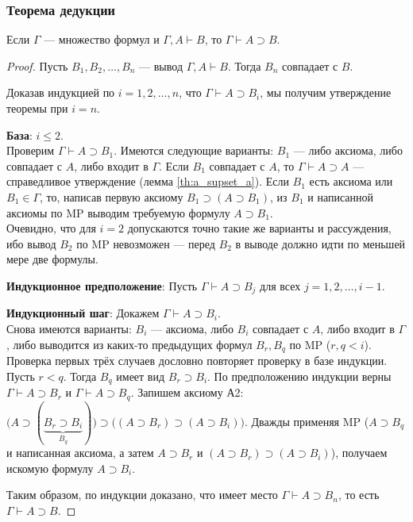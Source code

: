 \subsubsection{Теорема дедукции}
\nobreak\vspace{0.5em}
\nopagebreak
\begin{theorem}\label{th:deduction_th}
    Если $\Gamma$ --- множество формул и $\Gamma, A \vdash B$, то $\Gamma \vdash A \supset B$.
\end{theorem}
\begin{proof}\leavevmode

    Пусть $B_1, B_2, \dots, B_n$ --- вывод $\Gamma, A \vdash B$. Тогда $B_n$ совпадает с $B$. 

    Доказав индукцией по $i = 1, 2, \dots, n$, что $\Gamma \vdash A \supset B_i$, мы получим утверждение теоремы при $i = n$.

    \textbf{База}: $i \leqslant 2$. \\
    Проверим $\Gamma \vdash A \supset B_1$. Имеются следующие варианты: $B_1$ --- либо аксиома, либо совпадает с $A$, либо входит в $\Gamma$. Если $B_1$ совпадает с $A$, то $\Gamma \vdash A \supset A$ --- справедливое утверждение (лемма \ref{th:a_supset_a}). Если $B_1$ есть аксиома или $B_1 \in \Gamma$, то, написав первую аксиому $B_1 \supset (A \supset B_1)$, из $B_1$ и написанной аксиомы по MP выводим требуемую формулу $A \supset B_1$. \\
    Очевидно, что для $i = 2$ допускаются точно такие же варианты и рассуждения, ибо вывод $B_2$ по MP невозможен --- перед $B_2$ в выводе должно идти по меньшей мере две формулы.

    \textbf{Индукционное предположение}: Пусть $\Gamma \vdash A \supset B_j$ для всех $j = 1, 2, \dots, i - 1$.
    
    \textbf{Индукционный шаг}: Докажем $\Gamma \vdash A \supset B_i$. \\
    Снова имеются варианты: $B_i$ --- аксиома, либо $B_i$ совпадает с $A$, либо входит в $\Gamma$, либо выводится из каких-то предыдущих формул $B_r, B_q$ по MP ($r, q < i$). Проверка первых трёх случаев дословно повторяет проверку в базе индукции. Пусть $r < q$. Тогда $B_q$ имеет вид $B_r \supset B_i$. По предположению индукции верны $\Gamma \vdash A \supset B_r$ и $\Gamma \vdash A \supset B_q$. Запишем аксиому А2: $\big(A \supset (\underbrace{B_r \supset B_i}_{B_q})\big) \supset \big((A \supset B_r) \supset (A \supset B_i)\big)$. Дважды применяя MP ($A \supset B_q$ и написанная аксиома, а затем $A \supset B_r$ и $(A \supset B_r) \supset (A \supset B_i)$), получаем искомую формулу $A \supset B_i$.

    Таким образом, по индукции доказано, что имеет место $\Gamma \vdash A \supset B_n$, то есть $\Gamma \vdash A \supset B$.
\end{proof}

